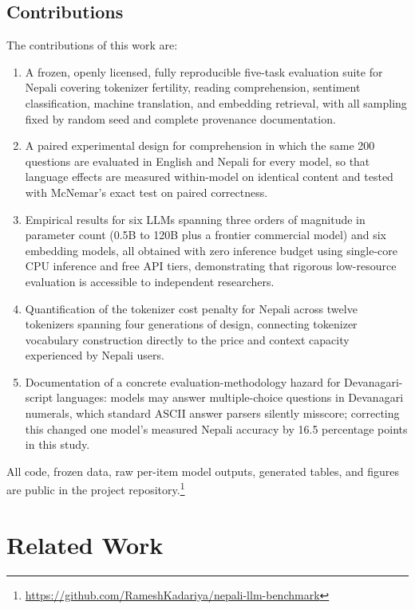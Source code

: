 \documentclass[conference]{IEEEtran}
\begin{document}
\subsection{Contributions}
The contributions of this work are:
\begin{enumerate}
\item A frozen, openly licensed, fully reproducible five-task evaluation suite for Nepali covering tokenizer fertility, reading comprehension, sentiment classification, machine translation, and embedding retrieval, with all sampling fixed by random seed and complete provenance documentation.
\item A paired experimental design for comprehension in which the same 200 questions are evaluated in English and Nepali for every model, so that language effects are measured within-model on identical content and tested with McNemar's exact test on paired correctness.
\item Empirical results for six LLMs spanning three orders of magnitude in parameter count (0.5B to 120B plus a frontier commercial model) and six embedding models, all obtained with zero inference budget using single-core CPU inference and free API tiers, demonstrating that rigorous low-resource evaluation is accessible to independent researchers.
\item Quantification of the tokenizer cost penalty for Nepali across twelve tokenizers spanning four generations of design, connecting tokenizer vocabulary construction directly to the price and context capacity experienced by Nepali users.
\item Documentation of a concrete evaluation-methodology hazard for Devanagari-script languages: models may answer multiple-choice questions in Devanagari numerals, which standard ASCII answer parsers silently misscore; correcting this changed one model's measured Nepali accuracy by 16.5 percentage points in this study.
\end{enumerate}

All code, frozen data, raw per-item model outputs, generated tables, and figures are public in the project repository.\footnote{\url{https://github.com/RameshKadariya/nepali-llm-benchmark}}

\section{Related Work}
\end{document}
